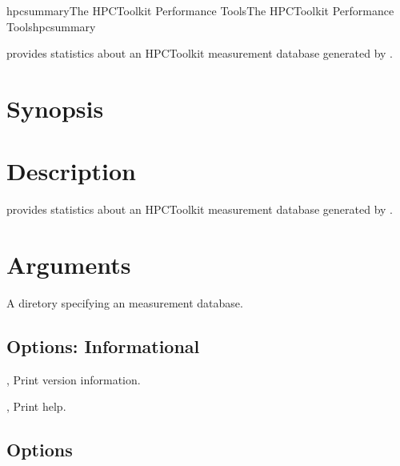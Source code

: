 \documentclass[english]{article}
\begin{document}
\begin{Name}{1}{hpcsummary}{The HPCToolkit Performance Tools}{The HPCToolkit Performance Tools}{hpcsummary}

 provides statistics about an HPCToolkit measurement database generated by .

\end{Name}

\section{Synopsis}

  

\section{Description}

 provides statistics about an HPCToolkit measurement database generated by .



\section{Arguments}

\begin{Description}
\item[\Arg{measurement-database}] A diretory specifying an  measurement database.
\end{Description}


\subsection{Options: Informational}

\begin{Description}
\item[\Opt{-V}, \Opt{--version}]
Print version information.

\item[\Opt{-h}, \Opt{--help}]
Print help.
\end{Description}


\subsection{Options}
\end{document}
